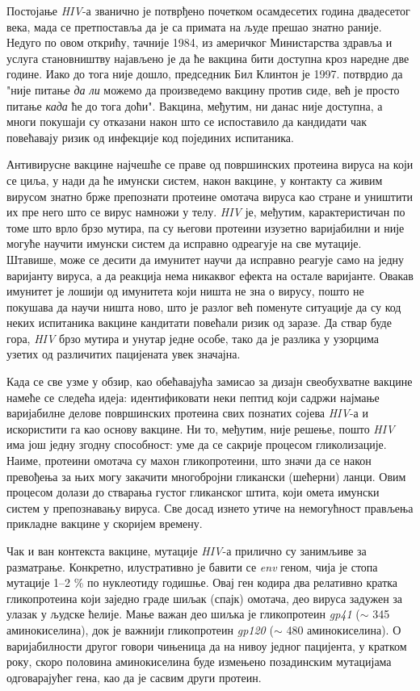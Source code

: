\documentclass[12pt,oneside]{memoir}
\begin{document}
Постојање \textit{HIV}-а званично је потврђено почетком осамдесетих година двадесетог века, мада се претпоставља да је са примата на људе прешао знатно раније. Недуго по овом открићу, тачније 1984, из америчког Министарства здравља и услуга становништву најављено је да ће вакцина бити доступна кроз наредне две године. Иако до тога није дошло, председник Бил Клинтон је 1997. потврдио да "није питање \textit{да ли} можемо да произведемо вакцину против сиде, већ је просто питање \textit{када} ће до тога доћи". Вакцина, међутим, ни данас није доступна, а многи покушаји су отказани након што се испоставило да кандидати чак повећавају ризик од инфекције код појединих испитаника.

Антивирусне вакцине најчешће се праве од површинских протеина вируса на који се циља, у нади да ће имунски систем, након вакцине, у контакту са живим вирусом знатно брже препознати протеине омотача вируса као стране и уништити их пре него што се вирус намножи у телу. \textit{HIV} је, међутим, карактеристичан по томе што врло брзо мутира, па су његови протеини изузетно варијабилни и није могуће научити имунски систем да исправно одреагује на све мутације. Штавише, може се десити да имунитет научи да исправно реагује само на једну варијанту вируса, а да реакција нема никаквог ефекта на остале варијанте. Овакав имунитет је лошији од имунитета који ништа не зна о вирусу, пошто не покушава да научи ништа ново, што је разлог већ поменуте ситуације да су код неких испитаника вакцине кандитати повећали ризик од заразе. Да ствар буде гора, \textit{HIV} брзо мутира и унутар једне особе, тако да је разлика у узорцима узетих од различитих пацијената увек значајна.

Када се све узме у обзир, као обећавајућа замисао за дизајн свеобухватне вакцине намеће се следећа идеја: идентификовати неки пептид који садржи најмање варијабилне делове површинских протеина свих познатих сојева \textit{HIV}-а и искористити га као основу вакцине. Ни то, међутим, није решење, пошто \textit{HIV} има још једну згодну способност: уме да се сакрије процесом гликолизације. Наиме, протеини омотача су махон гликопротеини, што значи да се након превођења за њих могу закачити многобројни гликански (шећерни) ланци. Овим процесом долази до стварања густог гликанског штита, који омета имунски систем у препознавању вируса. Све досад изнето утиче на немогућност прављења прикладне вакцине у скоријем времену.

Чак и ван контекста вакцине, мутације \textit{HIV}-а прилично су занимљиве за разматрање. Конкретно, илустративно је бавити се \textit{env} геном, чија је стопа мутације 1--2 \% по нуклеотиду годишње. Овај ген кодира два релативно кратка гликопротеина који заједно граде шиљак (спајк) омотача, део вируса задужен за улазак у људске ћелије. Мање важан део шиљка је гликопротеин \textit{gp41} ($\sim$ 345 аминокиселина), док је важнији гликопротеин \textit{gp120} ($\sim$ 480 аминокиселина). О варијабилности другог говори чињеница да на нивоу једног пацијента, у кратком року, скоро половина аминокиселина буде измењено позадинским мутацијама одговарајућег гена, као да је сасвим други протеин.
\end{document}
